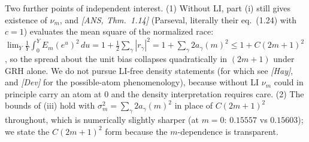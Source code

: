 \begin{remark}
Two further points of independent interest. (1) Without LI, part (i)
still gives existence of $\nu_m$, and \emph{[ANS, Thm.~1.14]}
(Parseval, literally their eq.~(1.24) with $c=1$) evaluates the mean
square of the normalized race:
$\lim_Y\frac1Y\int_0^YE_m(e^u)^2\,du=1+\tfrac12\sum_\gamma|r_\gamma|^2
=1+\sum_\gamma2a_\gamma(m)^2\le 1+C(2m+1)^2$, so the spread about the
unit bias collapses quadratically in $(2m+1)$ under GRH alone. We do
not pursue LI-free density statements (for which see \emph{[Hay]},
and \emph{[Dev]} for the possible-atom phenomenology), because
without LI $\nu_m$ could in principle carry an atom at $0$ and the
density interpretation requires care. (2) The bounds of (iii) hold with
$\sigma_m^2=\sum_\gamma 2a_\gamma(m)^2$ in place of $C(2m+1)^2$
throughout, which is numerically slightly sharper (at $m=0$:
$0.15557$ vs $0.15603$); we state the $C(2m+1)^2$ form because the
$m$-dependence is transparent.
\end{remark}

